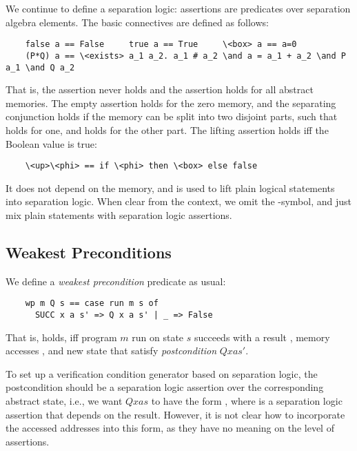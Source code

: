\documentclass[runningheads]{llncs}
\begin{document}
  We continue to define a separation logic: assertions are predicates over separation algebra elements.
  The basic connectives are defined as follows:
  \begin{lstlisting}
    false a == False     true a == True     \<box> a == a=0
    (P*Q) a == \<exists> a_1 a_2. a_1 # a_2 \and a = a_1 + a_2 \and P a_1 \and Q a_2
  \end{lstlisting}
  That is, the assertion  never holds and the assertion  holds for all abstract memories.
  The empty assertion  holds for the zero memory, and the separating conjunction 
  holds if the memory can be split into two disjoint parts, such that  holds for one,
  and  holds for the other part. The lifting assertion  holds iff the Boolean value  is true:
  \begin{lstlisting}
    \<up>\<phi> == if \<phi> then \<box> else false
  \end{lstlisting}
  It does not depend on the memory, and is used to lift plain logical statements into separation logic.
  When clear from the context, we omit the -symbol, and just mix plain statements with separation logic assertions.


  \subsection{Weakest Preconditions}
  We define a \emph{weakest precondition} predicate as usual:
  \begin{lstlisting}
    wp m Q s == case run m s of
      SUCC x a s' => Q x a s' | _ => False
  \end{lstlisting}
  That is,  holds, iff program \is$m$ run on state \is$s$ succeeds with a result , memory accesses ,
  and new state  that satisfy \emph{postcondition} \is$Q x a s'$.

  To set up a verification condition generator based on separation logic,
  the postcondition should be a separation logic assertion over the corresponding abstract state, i.e.,
  we want \is$Q x a s$ to have the form , where  is a separation logic assertion that depends on the result.
  However, it is not clear how to incorporate the accessed addresses  into this form, as they have no meaning on the level of assertions.
\end{document}
